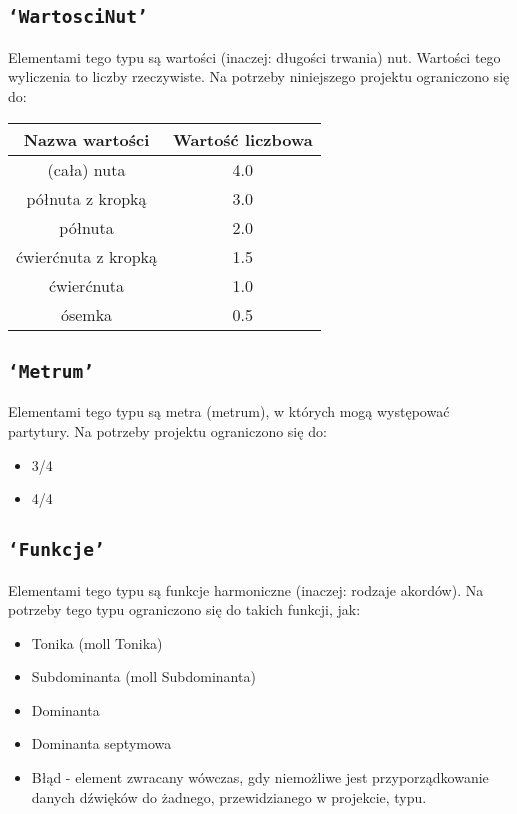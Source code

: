 \documentclass[dokumentacja.tex]{subfiles}
\begin{document}
\subsection{\texttt{`WartosciNut'}}
Elementami tego typu są wartości (inaczej: długości trwania) nut. Wartości tego wyliczenia to liczby rzeczywiste. Na potrzeby niniejszego projektu ograniczono się do: 
\begin{center}
    \begin{tabular}{|c|c|}
        \hline
        \textbf{Nazwa wartości} & \textbf{Wartość liczbowa} \\
        \hline
        (cała) nuta & 4.0\\ \hline
        półnuta z kropką & 3.0 \\ \hline
        półnuta & 2.0 \\ \hline
        ćwierćnuta z kropką & 1.5 \\ \hline
        ćwierćnuta & 1.0\\ \hline
        ósemka & 0.5 \\ \hline
    \end{tabular}
    \end{center}

\subsection{\texttt{`Metrum'}}
Elementami tego typu są metra (metrum), w których mogą występować partytury. Na potrzeby projektu ograniczono się do:
\begin{itemize}
    \item 3/4
    \item 4/4
\end{itemize}

\subsection{\texttt{`Funkcje'}}
Elementami tego typu są funkcje harmoniczne (inaczej: rodzaje akordów). Na potrzeby tego typu ograniczono się do takich funkcji, jak:
\begin{itemize}
    \item Tonika (moll Tonika)
    \item Subdominanta (moll Subdominanta)
    \item Dominanta
    \item Dominanta septymowa
    \item Błąd - element zwracany wówczas, gdy niemożliwe jest przyporządkowanie danych dźwięków do żadnego, przewidzianego w projekcie, typu.
\end{itemize}
\end{document}
